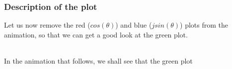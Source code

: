 \begin{frame}[t]

	\frametitle{Description of the plot}

	Let us now remove the red (\(cos(\theta)\)) and blue (\(jsin(\theta)\)) plots from the animation, so that we can get a good look at the green plot.\\~

	In the animation that follows, we shall see that the green plot

\end{frame}
